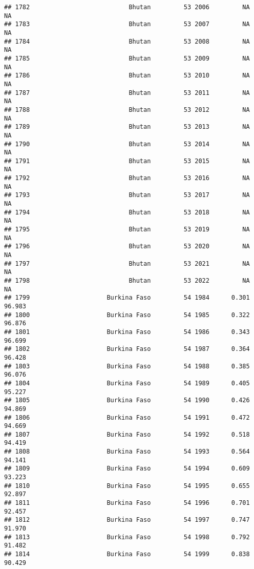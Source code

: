 \documentclass[
]{article}
\begin{document}
\begin{verbatim}
## 1782                           Bhutan         53 2006         NA         NA
## 1783                           Bhutan         53 2007         NA         NA
## 1784                           Bhutan         53 2008         NA         NA
## 1785                           Bhutan         53 2009         NA         NA
## 1786                           Bhutan         53 2010         NA         NA
## 1787                           Bhutan         53 2011         NA         NA
## 1788                           Bhutan         53 2012         NA         NA
## 1789                           Bhutan         53 2013         NA         NA
## 1790                           Bhutan         53 2014         NA         NA
## 1791                           Bhutan         53 2015         NA         NA
## 1792                           Bhutan         53 2016         NA         NA
## 1793                           Bhutan         53 2017         NA         NA
## 1794                           Bhutan         53 2018         NA         NA
## 1795                           Bhutan         53 2019         NA         NA
## 1796                           Bhutan         53 2020         NA         NA
## 1797                           Bhutan         53 2021         NA         NA
## 1798                           Bhutan         53 2022         NA         NA
## 1799                     Burkina Faso         54 1984      0.301     96.983
## 1800                     Burkina Faso         54 1985      0.322     96.876
## 1801                     Burkina Faso         54 1986      0.343     96.699
## 1802                     Burkina Faso         54 1987      0.364     96.428
## 1803                     Burkina Faso         54 1988      0.385     96.076
## 1804                     Burkina Faso         54 1989      0.405     95.227
## 1805                     Burkina Faso         54 1990      0.426     94.869
## 1806                     Burkina Faso         54 1991      0.472     94.669
## 1807                     Burkina Faso         54 1992      0.518     94.419
## 1808                     Burkina Faso         54 1993      0.564     94.141
## 1809                     Burkina Faso         54 1994      0.609     93.223
## 1810                     Burkina Faso         54 1995      0.655     92.897
## 1811                     Burkina Faso         54 1996      0.701     92.457
## 1812                     Burkina Faso         54 1997      0.747     91.970
## 1813                     Burkina Faso         54 1998      0.792     91.482
## 1814                     Burkina Faso         54 1999      0.838     90.429

\end{verbatim}
\end{document}
